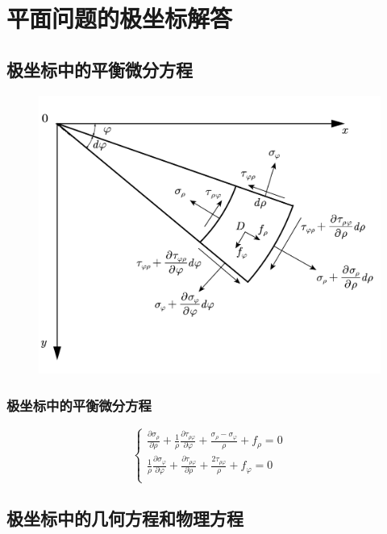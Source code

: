 \section{平面问题的极坐标解答}
\subsection{极坐标中的平衡微分方程}
\begin{figure}[!h]
\centering
\includegraphics[scale=0.5]{figure/4-1.png}
\caption{}
\end{figure}
\subsubsection{极坐标中的平衡微分方程}
\begin{equation}
\begin{cases}
\frac{\partial \sigma _{\rho}}{\partial \rho}+\frac{1}{\rho}\frac{\partial \tau _{\rho \varphi}}{\partial \varphi}+\frac{\sigma _{\rho}-\sigma _{\varphi}}{\rho}+f_{\rho}=0\\
\frac{1}{\rho}\frac{\partial \sigma _{\varphi}}{\partial \varphi}+\frac{\partial \tau _{\rho \varphi}}{\partial \rho}+\frac{2\tau _{\rho \varphi}}{\rho}+f_{\varphi}=0\\
\end{cases}
\end{equation}

\subsection{极坐标中的几何方程和物理方程}
